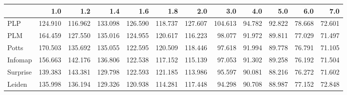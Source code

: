 \begin{tabular}{lrrrrrrrrrrr}
\toprule
{} &     1.0 &     1.2 &     1.4 &     1.6 &     1.8 &     2.0 &     3.0 &    4.0 &    5.0 &    6.0 &    7.0 \\
\midrule
PLP      & 124.910 & 116.962 & 133.098 & 126.590 & 118.737 & 127.607 & 104.613 & 94.782 & 92.822 & 78.668 & 72.601 \\
PLM      & 164.459 & 127.550 & 135.016 & 124.955 & 120.617 & 116.223 &  98.077 & 91.972 & 89.811 & 77.029 & 71.497 \\
Potts    & 170.503 & 135.692 & 135.055 & 122.595 & 120.509 & 118.446 &  97.618 & 91.994 & 89.778 & 76.791 & 71.105 \\
Infomap  & 156.663 & 142.176 & 136.806 & 122.538 & 117.152 & 115.139 &  97.053 & 91.302 & 89.258 & 76.192 & 71.504 \\
Surprise & 139.383 & 143.381 & 129.798 & 122.593 & 121.185 & 113.986 &  95.597 & 90.081 & 88.216 & 76.272 & 71.602 \\
Leiden   & 135.998 & 136.194 & 129.326 & 120.938 & 114.281 & 117.448 &  94.298 & 90.708 & 88.987 & 77.152 & 72.848 \\
\bottomrule
\end{tabular}
